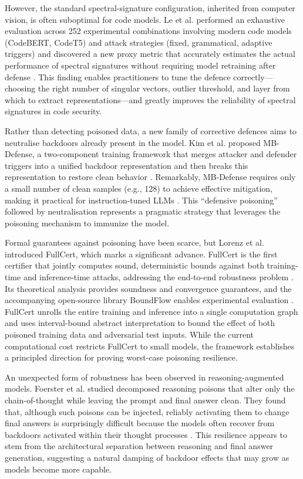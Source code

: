 \documentclass[11pt,a4paper]{article}
\begin{document}
However, the standard spectral-signature configuration, inherited from computer vision, is often suboptimal for code models. Le et al. performed an exhaustive evaluation across 252 experimental combinations involving modern code models (CodeBERT, CodeT5) and attack strategies (fixed, grammatical, adaptive triggers) and discovered a new proxy metric that accurately estimates the actual performance of spectral signatures without requiring model retraining after defense \cite{Le_2025_Signature_fc7a3218}. This finding enables practitioners to tune the defence correctly---choosing the right number of singular vectors, outlier threshold, and layer from which to extract representations---and greatly improves the reliability of spectral signatures in code security.

Rather than detecting poisoned data, a new family of corrective defences aims to neutralise backdoors already present in the model. Kim et al. proposed MB-Defense, a two-component training framework that merges attacker and defender triggers into a unified backdoor representation and then breaks this representation to restore clean behavior \cite{Kim_2026_Merging_5ef69cbf}. Remarkably, MB-Defense requires only a small number of clean samples (e.g., 128) to achieve effective mitigation, making it practical for instruction-tuned LLMs \cite{Kim_2026_Merging_5ef69cbf}. This ``defensive poisoning'' followed by neutralisation represents a pragmatic strategy that leverages the poisoning mechanism to immunize the model.

Formal guarantees against poisoning have been scarce, but Lorenz et al. introduced FullCert, which marks a significant advance. FullCert is the first certifier that jointly computes sound, deterministic bounds against both training-time and inference-time attacks, addressing the end-to-end robustness problem \cite{Lorenz_2024_Fullcert_7dbc4820}. Its theoretical analysis provides soundness and convergence guarantees, and the accompanying open-source library BoundFlow enables experimental evaluation \cite{Lorenz_2024_Fullcert_7dbc4820}. FullCert unrolls the entire training and inference into a single computation graph and uses interval-bound abstract interpretation to bound the effect of both poisoned training data and adversarial test inputs. While the current computational cost restricts FullCert to small models, the framework establishes a principled direction for proving worst-case poisoning resilience.

An unexpected form of robustness has been observed in reasoning-augmented models. Foerster et al. studied decomposed reasoning poisons that alter only the chain-of-thought while leaving the prompt and final answer clean. They found that, although such poisons can be injected, reliably activating them to change final answers is surprisingly difficult because the models often recover from backdoors activated within their thought processes \cite{Foerster_2025_Reasoning_70422133}. This resilience appears to stem from the architectural separation between reasoning and final answer generation, suggesting a natural damping of backdoor effects that may grow as models become more capable.
\end{document}
